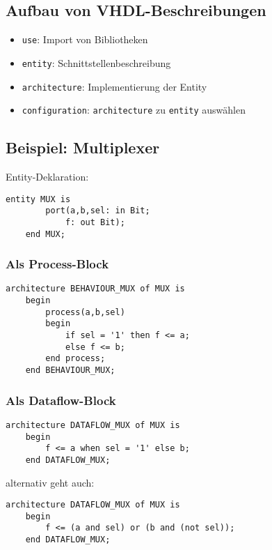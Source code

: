 \subsection{Aufbau von VHDL-Beschreibungen}
\begin{itemize}
    \item \lstinline[style=vhdl]{use}: Import von Bibliotheken
    \item \lstinline[style=vhdl]{entity}: Schnittstellenbeschreibung
    \item \lstinline[style=vhdl]{architecture}: Implementierung der Entity
    \item \lstinline[style=vhdl]{configuration}: \lstinline[style=vhdl]{architecture} zu \lstinline[style=vhdl]{entity} auswählen
\end{itemize}

\subsection{Beispiel: Multiplexer}
Entity-Deklaration:
\begin{lstlisting}[style=vhdl]
    entity MUX is
        port(a,b,sel: in Bit;
            f: out Bit);
    end MUX;
\end{lstlisting}

\subsubsection{Als Process-Block}
\begin{lstlisting}[style=vhdl]
    architecture BEHAVIOUR_MUX of MUX is
    begin
        process(a,b,sel)
        begin
            if sel = '1' then f <= a;
            else f <= b;
        end process;
    end BEHAVIOUR_MUX;
\end{lstlisting}

\subsubsection{Als Dataflow-Block}
\begin{lstlisting}[style=vhdl]
    architecture DATAFLOW_MUX of MUX is
    begin
        f <= a when sel = '1' else b;
    end DATAFLOW_MUX;
\end{lstlisting}
alternativ geht auch:
\begin{lstlisting}[style=vhdl]
    architecture DATAFLOW_MUX of MUX is
    begin
        f <= (a and sel) or (b and (not sel));
    end DATAFLOW_MUX;
\end{lstlisting}

